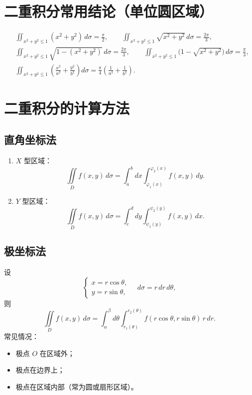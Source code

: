\section{二重积分常用结论（单位圆区域）}

\[
    \begin{aligned}
         & \iint_{x^2+y^2\le1}(x^2+y^2)\,d\sigma = \frac{\pi}{2}, \qquad
        \iint_{x^2+y^2\le1}\sqrt{x^2+y^2}\,d\sigma = \frac{2\pi}{3},                  \\[6pt]
         & \iint_{x^2+y^2\le1}\sqrt{1-(x^2+y^2)}\,d\sigma = \frac{2\pi}{3}, \qquad
        \iint_{x^2+y^2\le1}\!\!\bigl(1-\sqrt{x^2+y^2}\bigr)\,d\sigma = \frac{\pi}{3}, \\[6pt]
         & \iint_{x^2+y^2\le1}\!\!\left(\frac{x^2}{a^2}+\frac{y^2}{b^2}\right)d\sigma
        = \frac{\pi}{4}\!\left(\frac{1}{a^2}+\frac{1}{b^2}\right).
    \end{aligned}
\]


\section{二重积分的计算方法}

\subsection{直角坐标法}
\begin{enumerate}
    \item $X$ 型区域：
          \[
              \iint\limits_D f(x,y)\,d\sigma = \int_a^b \!dx \int_{\varphi_1(x)}^{\varphi_2(x)}\! f(x,y)\,dy.
          \]
    \item $Y$ 型区域：
          \[
              \iint\limits_D f(x,y)\,d\sigma = \int_c^d \!dy \int_{\psi_1(y)}^{\psi_2(y)}\! f(x,y)\,dx.
          \]
\end{enumerate}

\subsection{极坐标法}

设
\[
    \begin{cases}
        x = r\cos\theta, \\
        y = r\sin\theta,
    \end{cases}
    \quad d\sigma = r\,dr\,d\theta,
\]
则
\[
    \iint\limits_D f(x,y)\,d\sigma
    = \int_{\alpha}^{\beta}\!d\theta \int_{r_1(\theta)}^{r_2(\theta)}\! f(r\cos\theta, r\sin\theta)\,r\,dr.
\]
常见情况：
\begin{itemize}
    \item 极点 $O$ 在区域外；
    \item 极点在边界上；
    \item 极点在区域内部（常为圆或扇形区域）。
\end{itemize}


